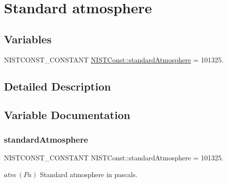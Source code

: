 \hypertarget{group___n_i_s_t_const-_standard_atmosphere}{}\section{Standard atmosphere}
\label{group___n_i_s_t_const-_standard_atmosphere}
\subsection*{Variables}
\begin{DoxyCompactItemize}
\item 
N\+I\+S\+T\+C\+O\+N\+S\+T\+\_\+\+C\+O\+N\+S\+T\+A\+NT \mbox{\hyperlink{group___n_i_s_t_const-_standard_atmosphere_ga6b5951b0dbdf131bb3138565e0828e79}{N\+I\+S\+T\+Const\+::standard\+Atmosphere}} = 101325.
\end{DoxyCompactItemize}


\subsection{Detailed Description}


\subsection{Variable Documentation}
\mbox{\label{group___n_i_s_t_const-_standard_atmosphere_ga6b5951b0dbdf131bb3138565e0828e79}} 
\subsubsection{\texorpdfstring{standard\+Atmosphere}{standardAtmosphere}}
{\footnotesize\ttfamily N\+I\+S\+T\+C\+O\+N\+S\+T\+\_\+\+C\+O\+N\+S\+T\+A\+NT N\+I\+S\+T\+Const\+::standard\+Atmosphere = 101325.}

$atm \ (Pa)$ Standard atmosphere in pascals. 